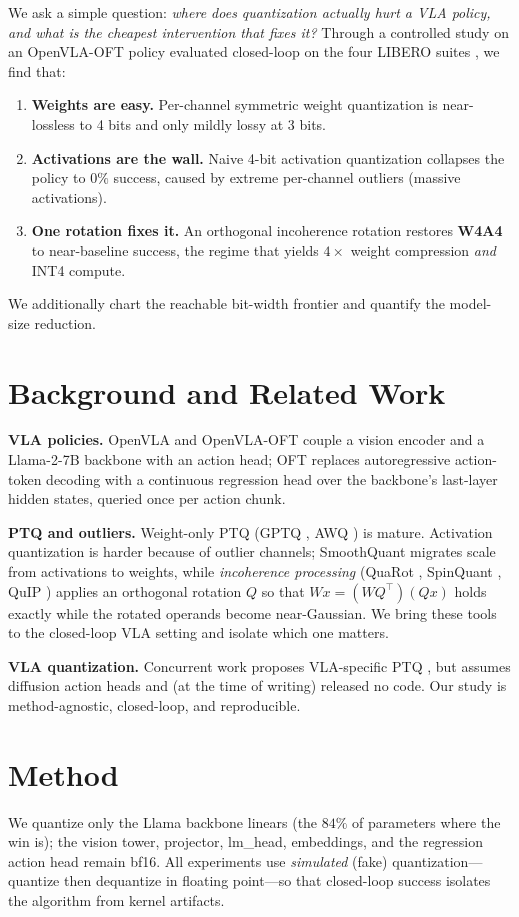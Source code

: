 \documentclass[conference]{IEEEtran}
\begin{document}
We ask a simple question: \emph{where does quantization actually hurt a VLA policy, and what
is the cheapest intervention that fixes it?} Through a controlled study on an OpenVLA-OFT
policy evaluated closed-loop on the four LIBERO suites \cite{libero}, we find that:
\begin{enumerate}
  \item \textbf{Weights are easy.} Per-channel symmetric weight quantization is near-lossless
        to 4 bits and only mildly lossy at 3 bits.
  \item \textbf{Activations are the wall.} Naive 4-bit activation quantization collapses the
        policy to $0\%$ success, caused by extreme per-channel outliers (massive activations).
  \item \textbf{One rotation fixes it.} An orthogonal incoherence rotation restores
        \textbf{W4A4} to near-baseline success, the regime that yields $4\times$ weight
        compression \emph{and} INT4 compute.
\end{enumerate}
We additionally chart the reachable bit-width frontier and quantify the model-size reduction.

\section{Background and Related Work}
\textbf{VLA policies.} OpenVLA \cite{openvla} and OpenVLA-OFT \cite{openvlaoft} couple a
vision encoder and a Llama-2-7B backbone with an action head; OFT replaces autoregressive
action-token decoding with a continuous regression head over the backbone's last-layer
hidden states, queried once per action chunk.

\textbf{PTQ and outliers.} Weight-only PTQ (GPTQ \cite{gptq}, AWQ \cite{awq}) is mature.
Activation quantization is harder because of outlier channels; SmoothQuant \cite{smoothquant}
migrates scale from activations to weights, while \emph{incoherence processing}
(QuaRot \cite{quarot}, SpinQuant \cite{spinquant}, QuIP \cite{quip}) applies an orthogonal
rotation $Q$ so that $Wx=(WQ^\top)(Qx)$ holds exactly while the rotated operands become
near-Gaussian. We bring these tools to the closed-loop VLA setting and isolate which one
matters.

\textbf{VLA quantization.} Concurrent work proposes VLA-specific PTQ
\cite{qvla,quantvla}, but assumes diffusion action heads and (at the time of writing)
released no code. Our study is method-agnostic, closed-loop, and reproducible.

\section{Method}
We quantize only the Llama backbone linears (the $84\%$ of parameters where the win is);
the vision tower, projector, lm\_head, embeddings, and the regression action head remain
bf16. All experiments use \emph{simulated} (fake) quantization---quantize then dequantize in
floating point---so that closed-loop success isolates the algorithm from kernel artifacts.
\end{document}
